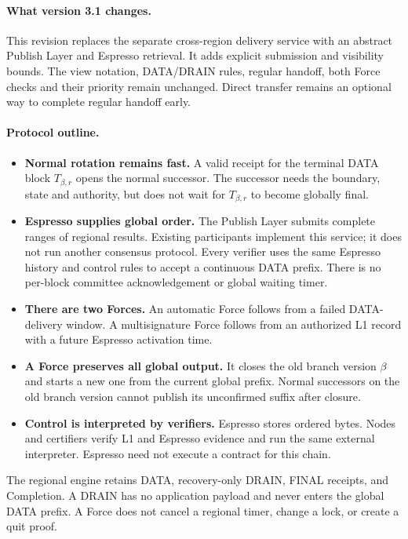 \documentclass[11pt,a4paper]{article}
\newcounter{protocol}
\begin{document}
\paragraph{What version 3.1 changes.}
This revision replaces the separate cross-region delivery service with
an abstract Publish Layer and Espresso retrieval. It adds explicit
submission and visibility bounds. The view notation, DATA/DRAIN rules,
regular handoff, both Force checks and their priority remain unchanged.
Direct transfer remains an optional way to complete regular handoff early.

\paragraph{Protocol outline.}
\begin{itemize}
\item \textbf{Normal rotation remains fast.} A valid receipt for the
terminal DATA block $T_{\beta,r}$ opens the normal successor. The successor
needs the boundary, state and authority, but does not wait for $T_{\beta,r}$
to become globally final.
\item \textbf{Espresso supplies global order.} The Publish Layer submits
complete ranges of regional results. Existing participants implement this
service; it does not run another consensus protocol. Every verifier uses the same
Espresso history and control rules to accept a continuous DATA prefix.
There is no per-block committee acknowledgement or global waiting timer.
\item \textbf{There are two Forces.} An automatic Force follows from
a failed DATA-delivery window. A multisignature Force follows from an
authorized L1 record with a future Espresso activation time.
\item \textbf{A Force preserves all global output.} It closes the old
branch version $\beta$ and starts a new one from the current
global prefix. Normal successors on the old branch version cannot publish its
unconfirmed suffix after closure.
\item \textbf{Control is interpreted by verifiers.} Espresso stores
ordered bytes. Nodes and certifiers verify L1 and Espresso evidence and
run the same external interpreter. Espresso need not execute a contract
for this chain.
\end{itemize}

The regional engine retains DATA, recovery-only DRAIN, FINAL receipts,
and Completion. A DRAIN has no application payload and never enters the
global DATA prefix. A Force does not cancel a regional timer, change a
lock, or create a quit proof.
\end{document}

